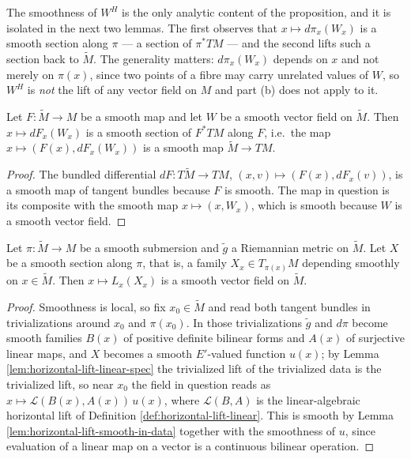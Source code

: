The smoothness of $W^H$ is the only analytic content of the proposition, and it is
isolated in the next two lemmas. The first observes that $x \mapsto d\pi_x(W_x)$ is
a smooth section along $\pi$ — a section of $\pi^* TM$ — and the second lifts such
a section back to $\tilde{M}$. The generality matters: $d\pi_x(W_x)$ depends on $x$
and not merely on $\pi(x)$, since two points of a fibre may carry unrelated values
of $W$, so $W^H$ is \emph{not} the lift of any vector field on $M$ and part (b)
does not apply to it.

\begin{lemma}
\label{lem:pushforward-along-map-smooth}
\leanok
{}
Let $F : \tilde{M} \to M$ be a smooth map and let $W$ be a smooth vector field on $\tilde{M}$. Then $x \mapsto dF_x(W_x)$ is a smooth section of $F^*TM$ along $F$, i.e.\ the map $x \mapsto (F(x), dF_x(W_x))$ is a smooth map $\tilde{M} \to TM$.
\end{lemma}

\begin{proof}
\leanok
The bundled differential $dF : T\tilde{M} \to TM$, $(x, v) \mapsto (F(x), dF_x(v))$, is a smooth map of tangent bundles because $F$ is smooth. The map in question is its composite with the smooth map $x \mapsto (x, W_x)$, which is smooth because $W$ is a smooth vector field.
\end{proof}

\begin{lemma}
\label{lem:horizontal-lift-along-smooth}
\leanok
{}
Let $\pi : \tilde{M} \to M$ be a smooth submersion and $\tilde{g}$ a Riemannian metric on $\tilde{M}$. Let $X$ be a smooth section along $\pi$, that is, a family $X_x \in T_{\pi(x)}M$ depending smoothly on $x \in \tilde{M}$. Then $x \mapsto L_x(X_x)$ is a smooth vector field on $\tilde{M}$.
\end{lemma}

\begin{proof}
\leanok
Smoothness is local, so fix $x_0 \in \tilde{M}$ and read both tangent bundles in trivializations around $x_0$ and $\pi(x_0)$. In those trivializations $\tilde{g}$ and $d\pi$ become smooth families $B(x)$ of positive definite bilinear forms and $A(x)$ of surjective linear maps, and $X$ becomes a smooth $E'$-valued function $u(x)$; by Lemma \ref{lem:horizontal-lift-linear-spec} the trivialized lift of the trivialized data is the trivialized lift, so near $x_0$ the field in question reads as $x \mapsto \mathcal{L}(B(x), A(x))\, u(x)$, where $\mathcal{L}(B,A)$ is the linear-algebraic horizontal lift of Definition \ref{def:horizontal-lift-linear}. This is smooth by Lemma \ref{lem:horizontal-lift-smooth-in-data} together with the smoothness of $u$, since evaluation of a linear map on a vector is a continuous bilinear operation.
\end{proof}

